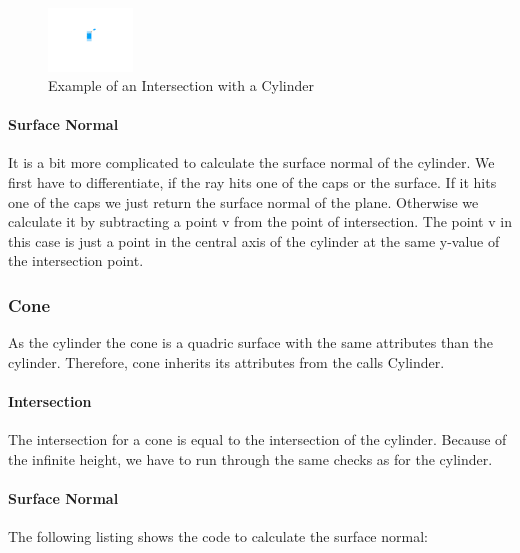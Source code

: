 \documentclass[10pt]{scrartcl}
\begin{document}
\begin{figure}[h]
  \centering
  \includegraphics[width=0.2\textwidth]{images/cylinder.pdf}
  \caption{Example of an Intersection with a Cylinder} 
  \label{fig:cylinderexmpl} 
\end{figure}

\paragraph{Surface Normal}

It is a bit more complicated to calculate the surface normal of the cylinder. We first have to differentiate, if the ray hits one of the caps or the surface. If it hits one of the caps we just return the surface normal of the plane. Otherwise we calculate it by subtracting a point v from the point of intersection. The point v in this case is just a point in the central axis of the cylinder at the same y-value of the intersection point.

\subsubsection{Cone}

As the cylinder the cone is a quadric surface with the same attributes than the cylinder. Therefore, cone inherits its attributes from the calls Cylinder.

\paragraph{Intersection}

The intersection for a cone is equal to the intersection of the cylinder. Because of the infinite height, we have to run through the same checks as for the cylinder.

\paragraph{Surface Normal}

The following listing shows the code to calculate the surface normal:
\end{document}
